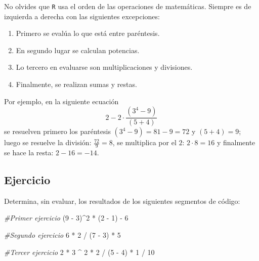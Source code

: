\documentclass[
]{book}
\newenvironment{Shaded}{\begin{snugshade}}{\end{snugshade}}
\newcommand{\CommentTok}[1]{\textcolor[rgb]{0.56,0.35,0.01}{\textit{#1}}}
\newcommand{\DecValTok}[1]{\textcolor[rgb]{0.00,0.00,0.81}{#1}}
\newcommand{\NormalTok}[1]{#1}
\newcommand{\SpecialCharTok}[1]{\textcolor[rgb]{0.00,0.00,0.00}{#1}}
\begin{document}
No olvides que \texttt{R} usa el orden de las operaciones de matemáticas. Siempre es de izquierda a derecha con las siguientes excepciones:

\begin{enumerate}
\def\labelenumi{\arabic{enumi}.}
\item
  Primero se evalúa lo que está entre paréntesis.
\item
  En segundo lugar se calculan potencias.
\item
  Lo tercero en evaluarse son multiplicaciones y divisiones.
\item
  Finalmente, se realizan sumas y restas.
\end{enumerate}

Por ejemplo, en la siguiente ecuación
\[
2 - 2 \cdot \frac{(3^4 - 9)}{(5 + 4)}
\]
se resuelven primero los paréntesis \((3^4 - 9) = 81 - 9 = 72\) y \((5 + 4) = 9\); luego se resuelve la división: \(\frac{72}{9}=8\), se multiplica por el \(2\): \(2 \cdot 8 = 16\) y finalmente se hace la resta: \(2-16 = -14\).

\hypertarget{ejercicio-11}{%
\subsection{Ejercicio}\label{ejercicio-11}}

Determina, sin evaluar, los resultados de los siguientes segmentos de código:

\begin{Shaded}
\begin{Highlighting}[]
\CommentTok{\#Primer ejercicio }
\NormalTok{(}\DecValTok{9} \SpecialCharTok{{-}} \DecValTok{3}\NormalTok{)}\SpecialCharTok{\^{}}\DecValTok{2} \SpecialCharTok{*}\NormalTok{ (}\DecValTok{2} \SpecialCharTok{{-}} \DecValTok{1}\NormalTok{) }\SpecialCharTok{{-}} \DecValTok{6}
\end{Highlighting}
\end{Shaded}

\begin{Shaded}
\begin{Highlighting}[]
\CommentTok{\#Segundo ejercicio }
\DecValTok{6} \SpecialCharTok{*} \DecValTok{2} \SpecialCharTok{/}\NormalTok{ (}\DecValTok{7} \SpecialCharTok{{-}} \DecValTok{3}\NormalTok{) }\SpecialCharTok{*} \DecValTok{5}
\end{Highlighting}
\end{Shaded}

\begin{Shaded}
\begin{Highlighting}[]
\CommentTok{\#Tercer ejercicio }
\DecValTok{2} \SpecialCharTok{*} \DecValTok{3} \SpecialCharTok{\^{}} \DecValTok{2} \SpecialCharTok{*} \DecValTok{2} \SpecialCharTok{/}\NormalTok{ (}\DecValTok{5} \SpecialCharTok{{-}} \DecValTok{4}\NormalTok{) }\SpecialCharTok{*} \DecValTok{1} \SpecialCharTok{/} \DecValTok{10} 
\end{Highlighting}
\end{Shaded}
\end{document}
